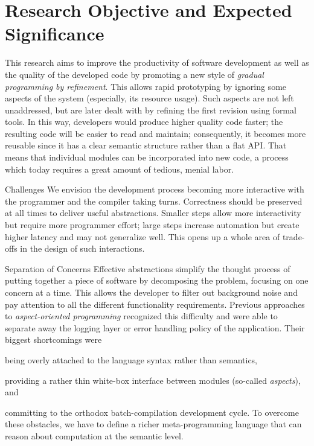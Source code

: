 \section{Research Objective and Expected Significance}

This research aims to improve the productivity of software development
as well as the quality of the developed code by promoting a new style
of \emph{gradual programming by refinement}.
This allows rapid prototyping by ignoring some aspects of the system
(especially, its resource usage).
Such aspects are not left unaddressed, but are later dealt with by refining
the first revision using formal tools.
In this way, developers would produce higher quality code faster;
the resulting code will be easier to read and maintain;
consequently, it becomes more reusable since it has a clear semantic structure
rather than a flat API.
That means that individual modules can be incorporated into new code,
a process which today requires a great amount of tedious, menial labor.

\begin{paragraph}{Challenges}
We envision the development process becoming more interactive with the programmer and the
compiler taking turns. Correctness should be preserved at all times
to deliver useful abstractions.
Smaller steps allow more interactivity but require more programmer
effort; large steps increase automation but create higher latency
and may not generalize well.
This opens up a whole area of trade-offs in the design of such interactions.
\end{paragraph}


\begin{subparagraph}{Separation of Concerns}
Effective abstractions simplify the thought process of putting together
a piece of software by decomposing the problem, focusing on
one concern at a time. This allows the developer to filter out background
noise and pay attention to all the different functionality requirements.
Previous approaches to \emph{aspect-oriented programming} recognized this
difficulty and were able to separate away \eg the logging layer or error
handling policy of the application. Their biggest shortcomings were 
\begin{enumerate*}[label=(\textit{\roman*})]
\item
being overly attached to the language syntax rather than semantics, 
\item
providing a rather thin white-box interface between modules
    (so-called \emph{aspects}), and
\item 
committing to the orthodox batch-compilation development cycle.
To overcome these obstacles, we have to define a richer meta-programming
language that can reason about computation at the semantic level.
\end{enumerate*}
\end{subparagraph}


